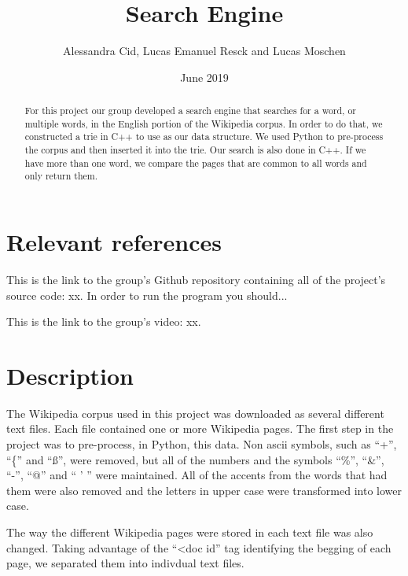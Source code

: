 \documentclass{article}
\title{Search Engine}
\author{Alessandra Cid, Lucas Emanuel Resck  
and Lucas Moschen}
\date{June 2019}
\begin{document}
\maketitle

\begin{abstract}
For this project our group developed a search engine that searches for a word, or multiple words, in the English portion of the Wikipedia corpus. In order to do that, we constructed a trie in C++ to use as our data structure. We used Python to pre-process the corpus and then inserted it into the trie. Our search is also done in C++. If we have more than one word, we compare the pages that are common to all words and only return them. 
\end{abstract}

\section*{Relevant references}
This is the link to the group's Github repository containing all of the project's 
source code: xx. In order to run the program you should...

This is the link to the group's video: xx. 

\section*{Description}
The Wikipedia corpus used in this project was downloaded as several different text files. Each file contained one or more Wikipedia pages. The first step in the project was to pre-process, in Python, this data. Non ascii symbols, such as ``+'', ``\{'' and ``ß'', were removed, but all of the numbers and the symbols ``\%'', ``\&'', ``-'', ``@'' and `` ' '' were maintained. All of the accents from the words that had them were also removed and the letters in upper case were transformed into lower case. 

The way the different Wikipedia pages were stored in each text file was also changed. Taking advantage of the ``<doc id'' tag identifying the begging of each page, we separated them into indivdual text files. 
\end{document}
